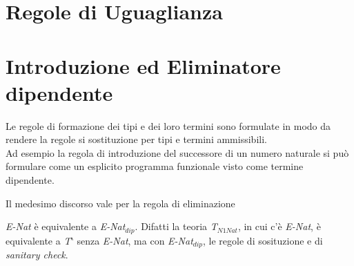 \section{Regole di Uguaglianza}
\label{subsec: uguaglianza-nat}
\normalsize
\begin{center}
\begin{prooftree}
\end{prooftree}
\end{center}

\section{Introduzione ed Eliminatore dipendente}
\label{subsec:introduzione-eliminatore dipendente-naturale}
Le regole di formazione dei tipi e dei loro termini sono formulate in modo da rendere la regole si sostituzione per tipi e termini ammissibili.\\
Ad esempio la regola di introduzione del successore di un numero naturale si pu\`o formulare come un esplicito programma funzionale visto come termine dipendente.
\begin{prooftree}
\end{prooftree}
Il medesimo discorso vale per la regola di eliminazione
\begin{prooftree}
\end{prooftree}
\noindent
\textit{E-Nat} \`e equivalente a \textit{E-Nat$_{dip}$}. Difatti la teoria \textit{T$_{N1Nat}$}, in cui c'\`e \textit{E-Nat}, \`e equivalente a \textit{T$\backprime$} senza \textit{E-Nat}, ma con \textit{E-Nat$_{dip}$}, le regole di sosituzione e di \textit{sanitary check}.


